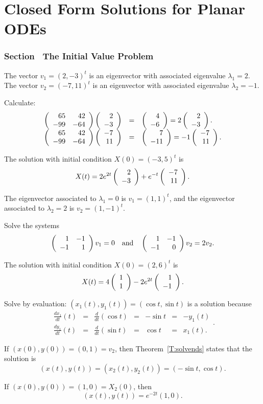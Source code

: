 \chapter{Closed Form Solutions for Planar ODEs}

\subsection*{Section~\protect{\ref{S:6.1}} The Initial Value Problem}

\ans The vector $v_1 = (2,-3)^t$ is an eigenvector with associated
eigenvalue $\lambda_1 = 2$.  The vector $v_2 = (-7,11)^t$ is an
eigenvector with associated eigenvalue $\lambda_2 = -1$.

\soln Calculate:
\[
\begin{array}{rcl}
\left(\begin{array}{rr} 65 & 42\\ -99 &-64\end{array}\right)\left(\begin{array}{r} 2 \\ -3\end{array}\right) & = & \left(\begin{array}{r} 4 \\ -6\end{array}\right) =
2\left(\begin{array}{r} 2 \\ -3\end{array}\right). \\
\left(\begin{array}{rr} 65 & 42\\ -99 &-64\end{array}\right)\left(\begin{array}{r} -7 \\ 11\end{array}\right) & = & \left(\begin{array}{r} 7 \\ -11\end{array}\right) =
-1\left(\begin{array}{r} -7 \\ 11\end{array}\right).
\end{array}
\]

 The solution with initial condition $X(0) = (-3,5)^t$ is
\[
X(t) = 2e^{2t}\left(\begin{array}{r} 2 \\ -3\end{array}\right) + e^{-t}\left(\begin{array}{r} -7 \\ 11\end{array}\right).
\]

\ans The eigenvector associated to $\lambda_1 = 0$ is $v_1 = (1,1)^t$,
and the eigenvector associated to $\lambda_2 = 2$ is $v_2 = (1,-1)^t$.

\soln Solve the systems
\[
\left(\begin{array}{rr} 1 & -1\\ -1 &1\end{array}\right)v_1 = 0 \quad\mbox{and}\quad \left(\begin{array}{rr} 1 & -1\\ -1 &0\end{array}\right)v_2 = 2v_2.
\]

 The solution with initial condition $X(0) = (2,6)^t$ is 
\[
X(t) = 4\left(\begin{array}{r} 1 \\ 1\end{array}\right) - 2e^{2t}\left(\begin{array}{r} 1 \\ -1\end{array}\right).
\]

Solve by evaluation:
$(x_1(t),y_1(t)) = (\cos t, \sin t)$
is a solution because
\[ \begin{array}{ccccccc}
\frac{dx_1}{dt}(t) & = & \frac{d}{dt}(\cos t) & = & -\sin t & = & -y_1(t)
\\ \frac{dy_1}{dt}(t) & = & \frac{d}{dt}(\sin t) & = & \cos t & = & x_1(t).
\end{array}. \]

If $(x(0),y(0)) = (0,1) = v_2$, then Theorem~\ref{T:solvends} states
that the solution is
\[
(x(t),y(t)) = (x_2(t),y_2(t)) = (-\sin t,\cos t).
\]

\ans If $(x(0),y(0)) = (1,0) = X_2(0)$, then
\[
(x(t),y(t)) = e^{-2t}(1,0).
\]

